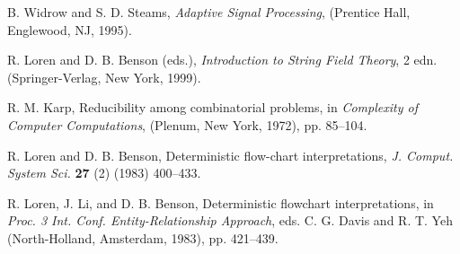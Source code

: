 \documentclass[11pt,twoside]{article}
\def\labart{yourLabel}      %
\begin{document}
\begin{multicols}{2}
\begin{thebibliography}{000}
B. Widrow and S. D. Steams, \emph{Adaptive Signal Processing}, (Prentice Hall, Englewood, NJ, 1995).

R. Loren and D. B. Benson (eds.), \emph{Introduction to String Field Theory}, 2 edn. (Springer-Verlag, New York, 1999).

R. M. Karp, Reducibility among combinatorial problems, in \emph{Complexity of Computer Computations}, (Plenum, New York, 1972), pp. 85--104.

R. Loren and D. B. Benson, Deterministic flow-chart interpretations, \emph{J. Comput. System Sci.} \textbf{27} (2) (1983) 400--433.

R. Loren, J. Li, and D. B. Benson, Deterministic flowchart interpretations, in \emph{Proc. 3 Int. Conf. Entity-Relationship Approach}, eds. C. G. Davis and R. T. Yeh
(North-Holland, Amsterdam, 1983), pp. 421--439.

\label{\labart-LastPage}
\end{thebibliography}
\end{multicols}
\end{document}
